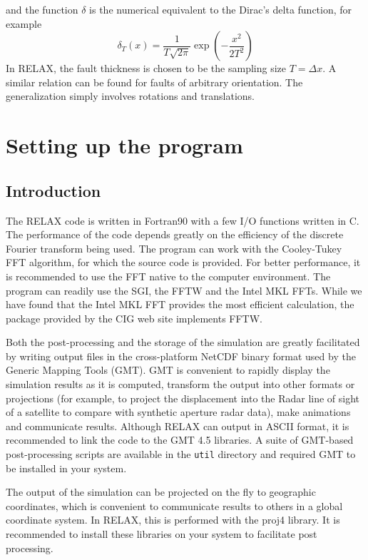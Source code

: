\documentclass[10pt]{article}
\begin{document}
and the function $\delta$ is the numerical equivalent to the Dirac's delta function, for example
\begin{equation}
\delta_T(x)=\frac{1}{T\sqrt{2\pi}}\exp\!\left(-\frac{x^2}{2T^2}\right)
\end{equation}
In RELAX, the fault thickness is chosen to be the sampling size $T=\Delta x$. A similar relation can be found for faults of arbitrary orientation. The generalization simply involves rotations and translations. 

\pagebreak
\section{Setting up the program}

\subsection{Introduction}
The RELAX code is written in Fortran90 with a few I/O functions written in C. The performance of the code depends greatly on the efficiency of the discrete Fourier transform being used. The program can work with the Cooley-Tukey FFT algorithm, for which the source code is provided. For better performance, it is recommended to use the FFT native to the computer environment. The program can readily use the SGI, the FFTW and the Intel MKL FFTs. While we have found that the Intel MKL FFT provides the most efficient calculation, the package provided by the CIG web site implements FFTW.

Both the post-processing and the storage of the simulation are greatly facilitated by writing output files in the cross-platform NetCDF binary format used by the Generic Mapping Tools (GMT). GMT is convenient to rapidly display the simulation results as it is computed, transform the output into other formats or projections (for example, to project the displacement into the Radar line of sight of a satellite to compare with synthetic aperture radar data), make animations and communicate results. Although RELAX can output in ASCII format, it is recommended to link the code to the GMT 4.5 libraries. A suite of GMT-based post-processing scripts are available in the \verb`util` directory and required GMT to be installed in your system.

The output of the simulation can be projected on the fly to geographic coordinates, which is convenient to communicate results to others in a global coordinate system. In RELAX, this is performed with the proj4 library. It is recommended to install these libraries on your system to facilitate post processing.
\end{document}
